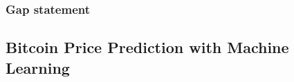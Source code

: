 \documentclass[12pt,a4paper,oneside]{article}
\begin{document}
%
%
%
%
%
%
%
%
%


\subsubsection{Gap statement}\label{subsubsec:kan_gap}



\subsection{Bitcoin Price Prediction with Machine Learning}\label{subsec:lit_btc}
\end{document}
